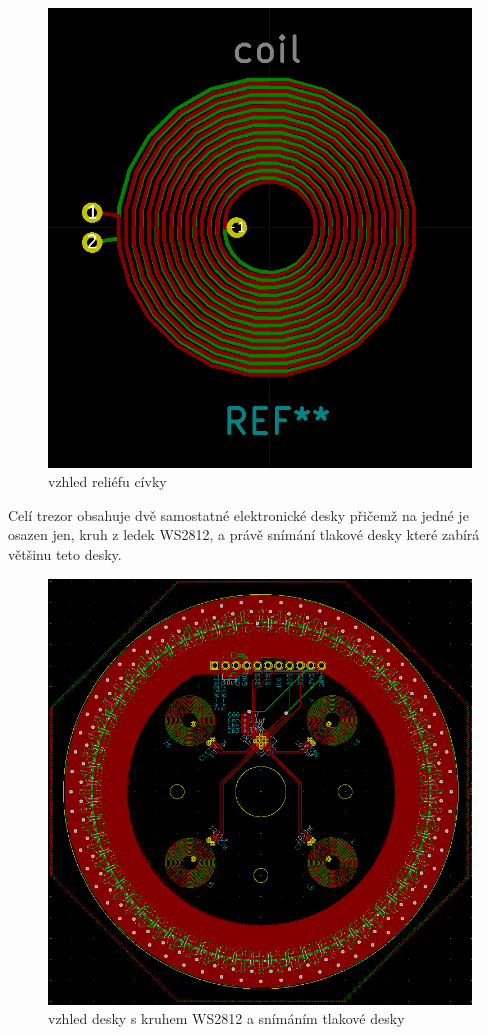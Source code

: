 \begin{figure}[htbp]
    \centering
    \includegraphics[width=\textwidth]{kapitoly/obrazky/E4/elektronika_tlakove_desky/civka.png}
    \caption{vzhled reliéfu cívky}
    \label{fig:E4-relief_civka}
\end{figure}

\newpage

Celí trezor obsahuje dvě samostatné elektronické desky přičemž na jedné je osazen jen, kruh z ledek WS2812, a právě snímání tlakové desky které zabírá 
většinu teto desky.

\begin{figure}[htbp]
    \centering
    \includegraphics[width=\textwidth]{kapitoly/obrazky/E4/elektronika_tlakove_desky/leddeska-KiCad.png}
    \caption{vzhled desky s kruhem WS2812 a snímáním tlakové desky}
    \label{fig:E4-LedDeska}
\end{figure}

\newpage